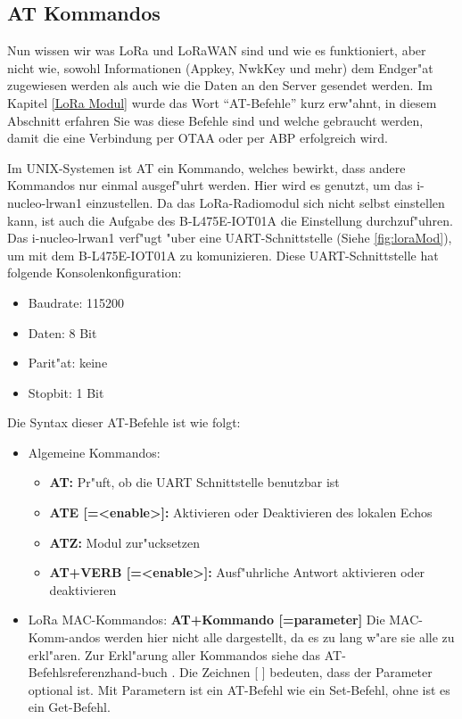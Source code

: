 \vspace{5cm}
\subsection{AT Kommandos}\label{AT}

Nun wissen wir was LoRa und LoRaWAN sind und wie es funktioniert, aber 
nicht wie, sowohl Informationen (Appkey, NwkKey und mehr) dem Endger"at 
zugewiesen werden als auch wie die Daten an den Server gesendet werden. 
Im Kapitel \ref{LoRa Modul} wurde das Wort ``AT-Befehle'' kurz erw"ahnt, 
in diesem Abschnitt erfahren Sie was diese Befehle sind und welche 
gebraucht werden, damit die eine Verbindung per OTAA oder per ABP 
erfolgreich wird.

Im UNIX-Systemen ist AT ein Kommando, welches bewirkt, dass andere Kommandos
nur einmal ausgef"uhrt werden. Hier wird es genutzt, um das
i-nucleo-lrwan1 einzustellen. Da das LoRa-Radiomodul sich nicht selbst
einstellen kann, ist auch die Aufgabe des B-L475E-IOT01A  die 
Einstellung durchzuf"uhren. Das i-nucleo-lrwan1 verf"ugt "uber eine 
UART-Schnittstelle (Siehe \ref{fig:loraMod}), um mit dem B-L475E-IOT01A 
zu komunizieren. Diese UART-Schnittstelle hat folgende 
Konsolenkonfiguration: 

\begin{itemize}
	\item Baudrate: 115200
	\item Daten: 8 Bit
	\item Parit"at: keine
	\item Stopbit: 1 Bit
\end{itemize}           

Die Syntax dieser AT-Befehle ist wie folgt: 
 
 \begin{itemize}
 	\item Algemeine Kommandos: 
 	\begin{itemize}
 		\item \textbf{AT:} Pr"uft, ob die UART Schnittstelle benutzbar ist
 		\item \textbf{ATE [=<enable>]:}  Aktivieren oder Deaktivieren
 		des lokalen Echos
 		\item \textbf{ATZ:} Modul zur"ucksetzen
 		\item \textbf{AT+VERB [=<enable>]:} Ausf"uhrliche Antwort
 		aktivieren oder deaktivieren 
 	\end{itemize}
 	\item LoRa MAC-Kommandos: \textbf{AT+Kommando [=parameter]}
 	Die MAC-Komm-andos werden hier nicht alle dargestellt, da es zu lang
 	w"are sie alle zu erkl"aren. Zur Erkl"arung aller Kommandos siehe
 	das AT-Befehlsreferenzhand-buch \cite{AT_Command}.
 	Die Zeichnen [ ] bedeuten, dass der Parameter optional ist. Mit
 	Parametern ist ein AT-Befehl wie ein Set-Befehl, ohne ist es ein
 	Get-Befehl.
 \end{itemize}  

